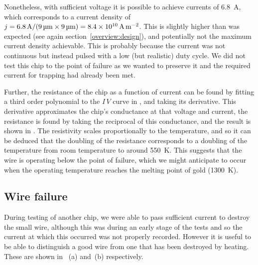 Nonetheless, with sufficient voltage it is possible to achieve currents of
\SI{6.8}{\ampere}, which  corresponds to a current density of
$j=\SI{6.8}{\ampere}/(\SI{9}{\micro\meter}\times\SI{9}{\micro\meter})=
\SI{8.4E10}{\ampere\per\meter\squared}$. This is slightly higher than was
expected (see again section~\ref{overview:design}), and potentially not the
maximum current density achievable. This is probably because the current was
not continuous but instead pulsed with a low (but realistic) duty cycle. We did
not test this chip to the point of failure as we wanted to preserve it and the
required current for trapping had already been met.

Further, the resistance of the chip as a function of current can be found by
fitting a third order polynomial to the $I\,V$ curve in
, and taking its derivative. This derivative
approximates the chip's conductance at that voltage and current, the resistance
is found by taking the reciprocal of this conductance, and the result is shown
in . The resistivity scales proportionally to
the temperature, and so it can be deduced that the doubling of the resistance
corresponds to a doubling of the temperature from room temperature to around
\SI{550}{\kelvin}.  This suggests that the wire is operating below the point of
failure, which we might anticipate to occur when the operating temperature
reaches the melting point of gold (\SI{1300}{\kelvin}).

\subsection{Wire failure}

During testing of another chip, we were able to pass sufficient current to
destroy the small wire, although this was during an early stage of the tests
and so the current at which this occurred was not properly recorded. However it
is useful to be able to distinguish a good wire from one that has been
destroyed by heating. These are shown in ~(a)
and~(b) respectively.

